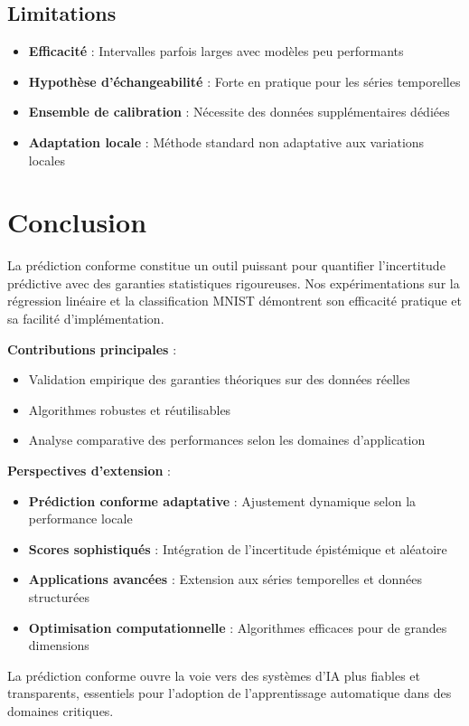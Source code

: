 \documentclass[a4paper,12pt]{article}
\begin{document}
\subsection{Limitations}

\begin{itemize}
\item \textbf{Efficacité} : Intervalles parfois larges avec modèles peu performants
\item \textbf{Hypothèse d'échangeabilité} : Forte en pratique pour les séries temporelles
\item \textbf{Ensemble de calibration} : Nécessite des données supplémentaires dédiées
\item \textbf{Adaptation locale} : Méthode standard non adaptative aux variations locales
\end{itemize}

\section{Conclusion}

La prédiction conforme constitue un outil puissant pour quantifier l'incertitude prédictive avec des garanties statistiques rigoureuses. Nos expérimentations sur la régression linéaire et la classification MNIST démontrent son efficacité pratique et sa facilité d'implémentation.

\textbf{Contributions principales} :
\begin{itemize}
\item Validation empirique des garanties théoriques sur des données réelles
\item Algorithmes robustes et réutilisables
\item Analyse comparative des performances selon les domaines d'application
\end{itemize}

\textbf{Perspectives d'extension} :
\begin{itemize}
\item \textbf{Prédiction conforme adaptative} : Ajustement dynamique selon la performance locale
\item \textbf{Scores sophistiqués} : Intégration de l'incertitude épistémique et aléatoire
\item \textbf{Applications avancées} : Extension aux séries temporelles et données structurées
\item \textbf{Optimisation computationnelle} : Algorithmes efficaces pour de grandes dimensions
\end{itemize}

La prédiction conforme ouvre la voie vers des systèmes d'IA plus fiables et transparents, essentiels pour l'adoption de l'apprentissage automatique dans des domaines critiques.
\end{document}
